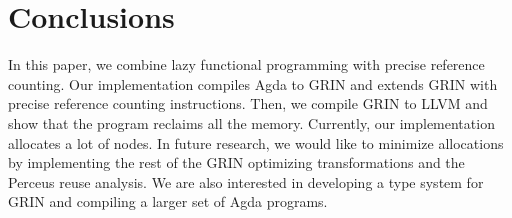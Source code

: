 \documentclass[9pt, twocolumn]{article}
\begin{document}
% 
%   
%   






\section{Conclusions}
In this paper, we combine lazy functional programming with precise reference counting.
Our implementation compiles Agda to GRIN and extends GRIN with precise reference counting instructions. 
Then, we compile GRIN to LLVM and show that the program reclaims all the memory.
Currently, our implementation allocates a lot of nodes. 
In future research, we would like to minimize allocations by implementing the rest of the GRIN optimizing transformations and the Perceus reuse analysis.
We are also interested in developing a type system for GRIN and compiling a larger set of Agda programs.
\end{document}
